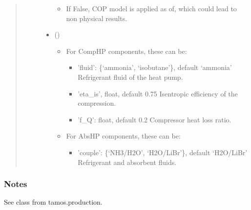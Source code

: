 \documentclass[letterpaper,10pt,english]{sphinxmanual}
\begin{document}
\begin{fulllineitems}
\begin{fulllineitems}
\begin{quote}
\begin{description}
\begin{itemize}
\begin{itemize}
\item {} 
\sphinxAtStartPar
If False, COP model is applied as of, which could lead to non physical results.

\end{itemize}


\item {} 
\sphinxAtStartPar
{} () \textendash{} \begin{itemize}
\item {} 
\sphinxAtStartPar
For CompHP components, these can be:
\begin{itemize}
\item {} 
\sphinxAtStartPar
’fluid’: \{‘ammonia’, ‘isobutane’\}, default ‘ammonia’
Refrigerant fluid of the heat pump.

\item {} 
\sphinxAtStartPar
’eta\_is’, float, default 0.75
Isentropic efficiency of the compression.

\item {} 
\sphinxAtStartPar
’f\_Q’: float, default 0.2
Compressor heat loss ratio.

\end{itemize}

\item {} 
\sphinxAtStartPar
For AbsHP components, these can be:
\begin{itemize}
\item {} 
\sphinxAtStartPar
’couple’: \{‘NH3/H2O’, ‘H2O/LiBr’\}, default ‘H2O/LiBr’
Refrigerant and absorbent fluids.

\end{itemize}

\end{itemize}


\end{itemize}

\end{description}\end{quote}
\subsubsection*{Notes}

\sphinxAtStartPar
See class  from tamos.production.

\end{fulllineitems}



\end{fulllineitems}
\end{document}
